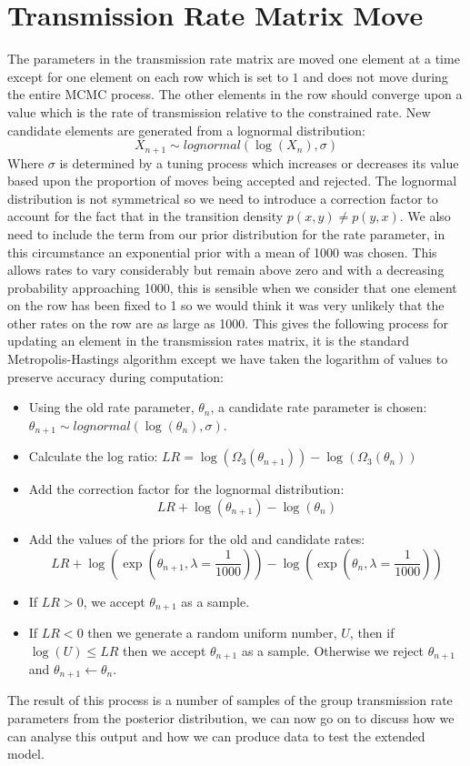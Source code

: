 \documentclass[11pt,a4paper]{report}
\begin{document}
\section{Transmission Rate Matrix Move}
The parameters in the transmission rate matrix are moved one element at a time except for one element on each row which is set to $1$ and does not move during the entire MCMC process. The other elements in the row should converge upon a value which is the rate of transmission relative to the constrained rate. New candidate elements are generated from a lognormal distribution:
\[ X_{n+1} \sim lognormal(\log(X_n),\sigma) \]
Where $\sigma$ is determined by a tuning process which increases or decreases its value based upon the proportion of moves being accepted and rejected. The lognormal distribution is not symmetrical so we need to introduce a correction factor to account for the fact that in the transition density $p(x,y) \neq p(y,x)$. We also need to include the term from our prior distribution for the rate parameter, in this circumstance an exponential prior with a mean of 1000 was chosen. This allows rates to vary considerably but remain above zero and with a decreasing probability approaching 1000, this is sensible when we consider that one element on the row has been fixed to 1 so we would think it was very unlikely that the other rates on the row are as large as 1000. This gives the following process for updating an element in the transmission rates matrix, it is the standard Metropolis-Hastings algorithm except we have taken the logarithm of values to preserve accuracy during computation:
\begin{itemize}
\item Using the old rate parameter, $\theta_n$, a candidate rate parameter is chosen: $\theta_{n+1} \sim lognormal(\log(\theta_n),\sigma)$.
\item Calculate the log ratio: $ LR = \log(\Omega_3(\theta_{n+1})) - \log(\Omega_3(\theta_{n}))$
\item Add the correction factor for the lognormal distribution: 
\[ LR + \log(\theta_{n+1}) - \log(\theta_n) \]
\item Add the values of the priors for the old and candidate rates: 
\[ LR + \log(\exp(\theta_{n+1},\lambda=\frac{1}{1000})) - \log(\exp(\theta_{n},\lambda=\frac{1}{1000}))\]
\item If $LR > 0$, we accept $\theta_{n+1}$ as a sample.
\item If $LR < 0$ then we generate a random uniform number, $U$, then if $\log(U) \leq LR$ then we accept $\theta_{n+1}$ as a sample. Otherwise we reject $\theta_{n+1}$ and $\theta_{n+1} \leftarrow \theta_n$.
\end{itemize}
The result of this process is a number of samples of the group transmission rate parameters from the posterior distribution, we can now go on to discuss how we can analyse this output and how we can produce data to test the extended model.
\end{document}
